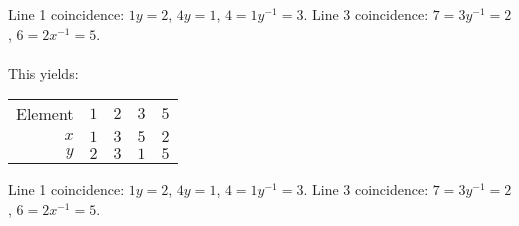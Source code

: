 Line 1 coincidence: $1y=2$, $4y=1$, $4=1y^{-1}=3$.
Line 3 coincidence: $7=3y^{-1}=2$, $6=2x^{-1}=5$.\\
\\
This yields:
\begin{center}
\begin{tabular} {|r||r|r|r|r|}
\hline
Element & $1$ & $2$ & $3$ & $5$ \\
$x$ & $1$ & $3$ & $5$ & $2$\\
\hline
$y$ & $2$ & $3$ & $1$ & $5$\\
\hline
\end{tabular}
\end{center}
Line 1 coincidence: $1y=2$, $4y=1$, $4=1y^{-1}=3$.
Line 3 coincidence: $7=3y^{-1}=2$, $6=2x^{-1}=5$.\\
